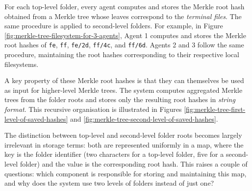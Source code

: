 For each top-level folder, every agent computes and stores the Merkle root hash obtained from a Merkle tree whose leaves correspond to the \emph{terminal files}. The same procedure is applied to second-level folders. For example, in Figure \ref{fig:merkle-tree-filesystem-for-3-agents}, Agent 1 computes and stores the Merkle root hashes of \texttt{fe}, \texttt{ff}, \texttt{fe/2d}, \texttt{ff/4c}, and \texttt{ff/6d}. Agents 2 and 3 follow the same procedure, maintaining the root hashes corresponding to their respective local filesystems.

A key property of these Merkle root hashes is that they can themselves be used as input for higher-level Merkle trees. The system computes aggregated Merkle trees from the folder roots and stores only the resulting root hashes in \textit{string format}. This recursive organisation is illustrated in Figures \ref{fig:merkle-tree-first-level-of-saved-hashes} and \ref{fig:merkle-tree-second-level-of-saved-hashes}.

The distinction between top-level and second-level folder roots becomes largely irrelevant in storage terms: both are represented uniformly in a map, where the key is the folder identifier (two characters for a top-level folder, five for a second-level folder) and the value is the corresponding root hash. This raises a couple of questions: which component is responsible for storing and maintaining this map, and why does the system use two levels of folders instead of just one?

